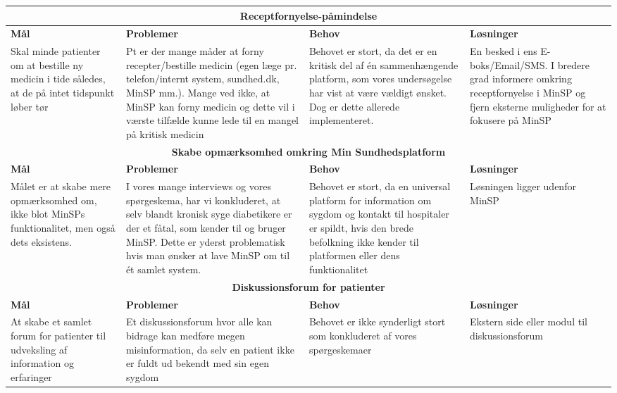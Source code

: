 \newpage

\begin{tabularx}{\textwidth}{|X|X|X|X|}
	\hline
	\multicolumn{4}{|c|}{\textbf{Receptfornyelse-påmindelse}}\\
	\hline
	\textbf{Mål} & \textbf{Problemer} & \textbf{Behov} & \textbf{Løsninger}\\
	\hline
	Skal minde patienter om at bestille ny medicin i tide således, at de på intet tidspunkt løber tør&
	Pt er der mange måder at forny recepter/bestille medicin (egen læge pr. telefon/internt system, sundhed.dk, MinSP mm.). Mange ved ikke, at MinSP kan forny medicin og dette vil i værste tilfælde kunne lede til en mangel på kritisk medicin&
	Behovet er stort, da det er en kritisk del af én sammenhængende platform, som vores undersøgelse har vist at være vældigt ønsket. Dog er dette allerede implementeret.&
	En besked i ens E-boks/Email/SMS. I bredere grad informere omkring receptfornyelse i MinSP og fjern eksterne muligheder for at fokusere på MinSP\\
	\hline
	\multicolumn{4}{|c|}{\textbf{Skabe opmærksomhed omkring Min Sundhedsplatform}}\\
	\hline
	\textbf{Mål} & \textbf{Problemer} & \textbf{Behov} & \textbf{Løsninger}\\
	\hline
	Målet er at skabe mere opmærksomhed om, ikke blot MinSPs funktionalitet, men også dets eksistens.&
	I vores mange interviews og vores spørgeskema, har vi konkluderet, at selv blandt kronisk syge diabetikere er der et fåtal, som kender til og bruger MinSP. Dette er yderst problematisk hvis man ønsker at lave MinSP om til ét samlet system.&
	Behovet er stort, da en universal platform for information om sygdom og kontakt til hospitaler er spildt, hvis den brede befolkning ikke kender til platformen eller dens funktionalitet&
	Løsningen ligger udenfor MinSP\\
	\hline
	\multicolumn{4}{|c|}{\textbf{Diskussionsforum for patienter}}\\
	\hline
	\textbf{Mål} & \textbf{Problemer} & \textbf{Behov} & \textbf{Løsninger}\\
	\hline
	At skabe et samlet forum for patienter til udveksling af information og erfaringer&
	Et diskussionsforum hvor alle kan bidrage kan medføre megen misinformation, da selv en patient ikke er fuldt ud bekendt med sin egen sygdom&
	Behovet er ikke synderligt stort som konkluderet af vores spørgeskemaer&
	Ekstern side eller modul til diskussionsforum\\
	\hline
\end{tabularx}